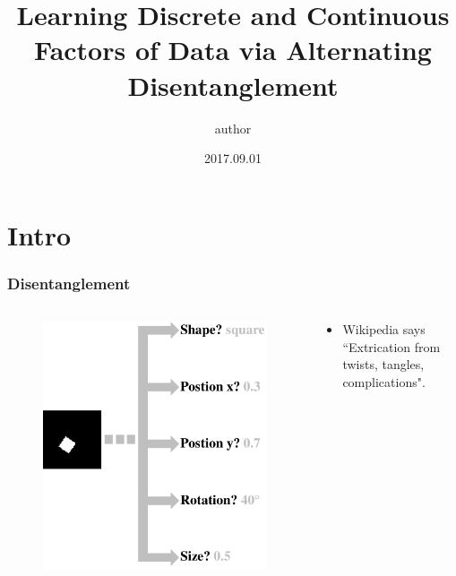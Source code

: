 \documentclass[10pt,mathserif]{beamer}
\title{Learning Discrete and Continuous Factors of Data via Alternating Disentanglement}
\author{author}
\institute
    {Seoul National University}
\date{2017.09.01}
\begin{document}
\begin{frame}
  \titlepage
\end{frame}

\section{Intro}

\begin{frame}
\frametitle{Disentanglement}
\begin{columns}
\begin{column}{0.5\textwidth}
\begin{figure}
\includegraphics[width=\linewidth]{disentanglement}
\end{figure}
\end{column}
\begin{column}{0.5\textwidth}
\begin{itemize}\itemsep=12pt
\item Wikipedia says ``Extrication from twists, tangles, complications".
\end{itemize}
\end{column}
\end{columns}

\end{frame}
\end{document}
